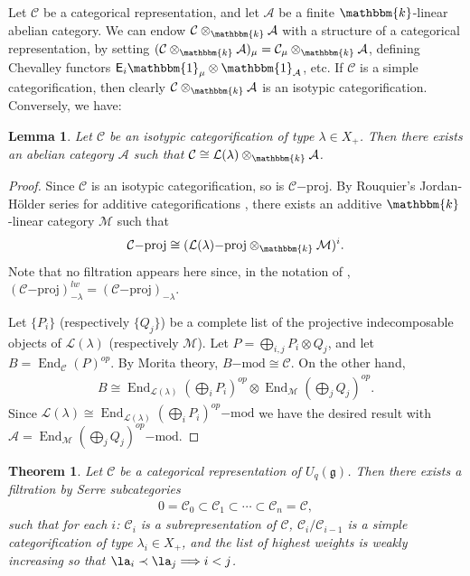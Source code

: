 \documentclass[11pt,reqno]{amsart}
\numberwithin{equation}{section}
\newtheorem{Theorem}[equation]{Theorem}
\newtheorem{Lemma}[equation]{Lemma}
\theoremstyle{definition}
\theoremstyle{named}
\newcommand{\cA}{\mathcal{A}}
\newcommand{\cC}{\mathcal{C}}
\newcommand{\sE}{\mathsf{E}}
\newcommand{\cL}{\mathcal{L}}
\newcommand{\cM}{\mathcal{M}}
\newcommand{\fg}{\mathfrak{g}}
\newcommand{\kk}{\mathbbm{k}}
\DeclareMathOperator{\End}{End}
\newcommand{\bone}{\mathbbm{1}}
\newcommand{\mmod}{\mathrm{-mod}}
\newcommand{\proj}{\mathrm{-proj}}
\begin{document}
Let $\cC$ be a categorical representation, and let $\cA$ be a finite $\kk$-linear abelian category.  We can endow $\cC \otimes_\kk\cA$ with a structure of a categorical representation, by setting $(\cC \otimes_\kk\cA)_\mu=\cC_\mu \otimes_\kk\cA$, defining Chevalley functors $\sE_i\bone_\mu \otimes \bone_\cA$, etc.  If $\cC$ is a simple categorification, then clearly  $\cC \otimes_\kk\cA$ is an isotypic categorification.  Conversely, we have:  

\begin{Lemma}\label{lem:isocat}
Let $\cC$ be an isotypic categorification of type $\lambda \in X_+$.  Then there exists an abelian category $\cA$ such that $\cC \cong \cL(\lambda)\otimes_\kk \cA$.  
\end{Lemma}


\begin{proof}
Since $\cC$ is an isotypic categorification, so is $\cC\proj$.  By Rouquier's Jordan-H\"older series for additive categorifications \cite[Theorem 5.8]{Rou2KM}, there exists an additive $\kk$-linear category $\cM$ such that 
\begin{align*}
\cC\proj\cong (\cL(\lambda)\proj \otimes_\kk \cM)^i.
\end{align*}
Note that no filtration appears here since, in the notation of \cite{Rou2KM}, $(\cC\proj)_{-\lambda}^{lw}=(\cC\proj)_{-\lambda}$.

Let $\{P_i\}$ (respectively $\{Q_j\}$) be a complete list of the projective indecomposable objects of $\cL(\lambda)$ (respectively $\cM$).  Let $P=\bigoplus_{i,j}P_i\otimes Q_j$, and let $B=\End_\cC(P)^{op}$.  By Morita theory, $B\mmod\cong \cC$.  On the other hand,
\begin{align*}
B\cong \End_{\cL(\lambda)}(\bigoplus_i P_i)^{op} \otimes \End_\cM(\bigoplus_j Q_j)^{op}.
\end{align*}
Since $\cL(\lambda)\cong \End_{\cL(\lambda)}(\bigoplus_i P_i)^{op}\mmod$ we have the desired result with $\cA=\End_\cM(\bigoplus_j Q_j)^{op}\mmod$.
\end{proof}

\begin{Theorem}\label{thm:JH}
Let $\cC$ be a categorical representation of $U_q(\fg)$.  Then there exists a filtration by Serre subcategories
\begin{align}\label{eq:JHfiltration}
0=\cC_0 \subset \cC_1\subset \cdots\subset \cC_n=\cC, 
\end{align}
such that for each $i$: $\cC_i$ is a subrepresentation of $\cC$, 
$\cC_{i}/\cC_{i-1}$ is a simple categorification of type $\lambda_i\in X_+$, and the list of highest weights is weakly increasing so that $\la_i \prec \la_j \Longrightarrow i<j$. 
\end{Theorem}
\end{document}
